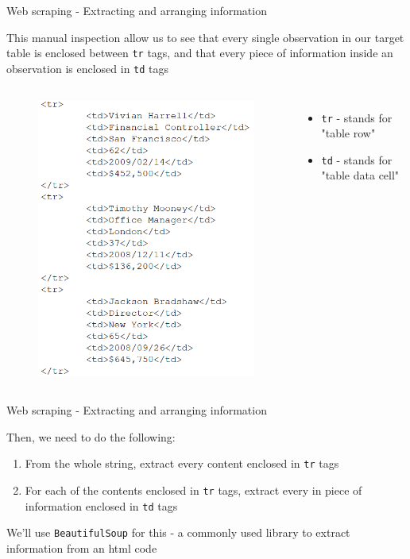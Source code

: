 \documentclass[aspectratio=169]{beamer}
\begin{document}
\begin{frame}{Web scraping - Extracting and arranging information}

	This manual inspection allow us to see that every single observation in our target table is enclosed between \texttt{tr} tags, and that every piece of information inside an observation is enclosed in \texttt{td} tags
	
	\begin{columns}[c]

		\begin{figure}
			\centering
			\includegraphics[width=0.6\linewidth]{img/tags2.png}
		\end{figure}
		
		\begin{itemize}
			\item \texttt{tr} - stands for "table row"
			\item \texttt{td} - stands for "table data cell"
		\end{itemize}
		
	\end{columns}


\end{frame}

\begin{frame}{Web scraping - Extracting and arranging information}

	Then, we need to do the following:

	\begin{enumerate}
		\item From the whole string, extract every content enclosed in \texttt{tr} tags
		\item For each of the contents enclosed in \texttt{tr} tags, extract every in piece of information enclosed in \texttt{td} tags
	\end{enumerate}

	We'll use \texttt{BeautifulSoup} for this 
	- a commonly used library to extract information from an html code

\end{frame}
\end{document}
